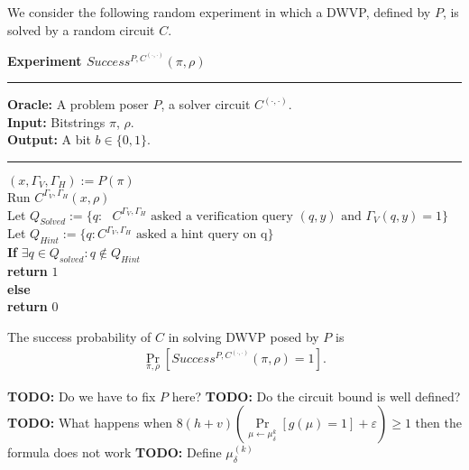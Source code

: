 %
We consider the following random experiment in which a DWVP, defined by $P$, is solved by a random circuit $C$.
\begin{codeblock}
  \textbf{Experiment $Success^{P, C^{(\cdot, \cdot)}}(\pi, \rho) $}
  \medskip
  \hrule
  \medskip
  \textbf{Oracle:} A problem poser $P$, a solver circuit $C^{(\cdot,\cdot)}$.\\
  \textbf{Input:}  Bitstrings $\pi$, $\rho$.\\
  \textbf{Output:} A bit $b \in \{0,1\}$.
  \medskip\hrule\medskip
  $(x, \Gamma_V, \Gamma_H) := P(\pi)$ \\
  Run $C^{\Gamma_V,\Gamma_H}(x, \rho)$ \\
  \IndI Let $Q_{Solved} := \{q: \text{ $C^{\Gamma_V, \Gamma_H}$ asked a verification query $(q,y)$ and $\Gamma_V(q, y) = 1$} \}$\\
  \IndI Let $Q_{Hint} := \{q: \text{$C^{\Gamma_V, \Gamma_H}$ asked a hint query on q} \}$\\
  \textbf{If} $\exists q \in Q_{solved} : q \notin Q_{Hint}$ \then \\
  \IndI \textbf{return} $1$\\
  \textbf{else} \\
  \IndI \textbf{return} $0$\\
\end{codeblock}
%
The success probability of $C$ in solving DWVP posed by $P$ is
\begin{align}
 \underset{\pi, \rho}{\Pr}[Success^{P,C^{(\cdot, \cdot)}}(\pi, \rho) = 1].
\end{align}
%
\begin{todo}
  \textbf{TODO:} Do we have to fix $P$ here?
  \textbf{TODO:} Do the circuit bound is well defined?
  \textbf{TODO:} What happens when $8(h+v) \left(\underset{\mu \leftarrow \mu_\delta^k}{\Pr}[g(\mu) = 1] + \varepsilon\right) \geq 1$ then the formula does not work
  \textbf{TODO:} Define $\mu_{\delta}^{(k)}$
\end{todo}
%
